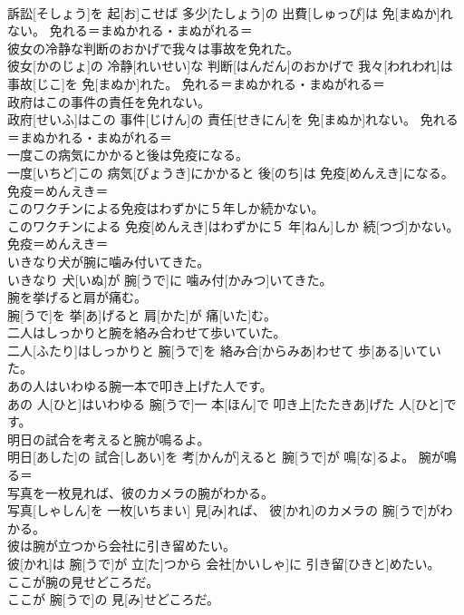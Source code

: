 \documentclass[8pt]{extreport}
\begin{document}
\begin{CJK}{UTF8}{min}
{\\	訴訟[そしょう]を 起[お]こせば 多少[たしょう]の 出費[しゅっぴ]は 免[まぬか]れない。	免れる＝まぬかれる・まぬがれる＝ 
\\	彼女の冷静な判断のおかげで我々は事故を免れた。	
\\	彼女[かのじょ]の 冷静[れいせい]な 判断[はんだん]のおかげで 我々[われわれ]は 事故[じこ]を 免[まぬか]れた。	免れる＝まぬかれる・まぬがれる＝ 
\\	政府はこの事件の責任を免れない。	
\\	政府[せいふ]はこの 事件[じけん]の 責任[せきにん]を 免[まぬか]れない。	免れる＝まぬかれる・まぬがれる＝ 
\\	一度この病気にかかると後は免疫になる。	
\\	一度[いちど]この 病気[びょうき]にかかると 後[のち]は 免疫[めんえき]になる。	免疫＝めんえき＝ 
\\	このワクチンによる免疫はわずかに５年しか続かない。	
\\	このワクチンによる 免疫[めんえき]はわずかに５ 年[ねん]しか 続[つづ]かない。	免疫＝めんえき＝ 
\\	いきなり犬が腕に噛み付いてきた。	
\\	いきなり 犬[いぬ]が 腕[うで]に 噛み付[かみつ]いてきた。	
\\	腕を挙げると肩が痛む。	
\\	腕[うで]を 挙[あ]げると 肩[かた]が 痛[いた]む。	
\\	二人はしっかりと腕を絡み合わせて歩いていた。	
\\	二人[ふたり]はしっかりと 腕[うで]を 絡み合[からみあ]わせて 歩[ある]いていた。	
\\	あの人はいわゆる腕一本で叩き上げた人です。	
\\	あの 人[ひと]はいわゆる 腕[うで]一 本[ほん]で 叩き上[たたきあ]げた 人[ひと]です。	
\\	明日の試合を考えると腕が鳴るよ。	
\\	明日[あした]の 試合[しあい]を 考[かんが]えると 腕[うで]が 鳴[な]るよ。	腕が鳴る＝ 
\\	写真を一枚見れば、彼のカメラの腕がわかる。	
\\	写真[しゃしん]を 一枚[いちまい] 見[み]れば、 彼[かれ]のカメラの 腕[うで]がわかる。	
\\	彼は腕が立つから会社に引き留めたい。	
\\	彼[かれ]は 腕[うで]が 立[た]つから 会社[かいしゃ]に 引き留[ひきと]めたい。	
\\	ここが腕の見せどころだ。	
\\	ここが 腕[うで]の 見[み]せどころだ。	
}
\end{CJK}
\end{document}
